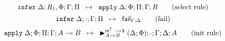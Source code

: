 \[
\mathtt{infer} \; \Delta; R_1, \Phi; \Gamma; \Pi \;\; \mapsto \;\; \mathtt{apply} \; \Delta; \Phi; \Pi; \Gamma; R \tag{select rule}
\]
\[
\mathtt{infer} \; \Delta; \cdot; \Gamma; \Pi \;\; \mapsto \;\; \mathsf{fail}_{\Gamma; \Delta} \tag{fail}
\]
\[
\mathtt{apply} \; \Delta; \Phi; \Pi; \Gamma; A \multimap B \;\; \mapsto \;\; {\blacktriangleright}_{A \multimap B}^{\mathsf{m}^\Gamma \; \cdot \rightarrow
                                                            \mathbf{1}} \; (\Delta; \Phi); \cdot; \Gamma; \Delta; A \tag{init rule}
\]

